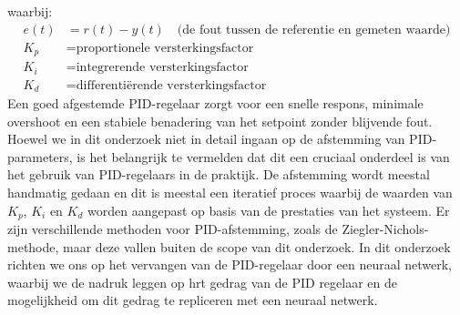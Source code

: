 waarbij:
\[
\begin{aligned}
e(t) &= r(t) - y(t) \quad \text{(de fout tussen de referentie en gemeten waarde)} \\
K_p  &= \text{proportionele versterkingsfactor} \\
K_i  &= \text{integrerende versterkingsfactor} \\
K_d  &= \text{differentiërende versterkingsfactor}
\end{aligned}
\]
Een goed afgestemde PID-regelaar zorgt voor een snelle respons, minimale overshoot en een stabiele benadering van het setpoint zonder blijvende fout. Hoewel we in dit onderzoek niet in detail ingaan op de afstemming van PID-parameters, is het belangrijk te vermelden dat dit een cruciaal onderdeel is van het gebruik van PID-regelaars in de praktijk. De afstemming wordt meestal handmatig gedaan en dit is meestal een iteratief proces waarbij de waarden van \(K_p\), \(K_i\) en \(K_d\) worden aangepast op basis van de prestaties van het systeem. Er zijn verschillende methoden voor PID-afstemming, zoals de Ziegler-Nichols-methode, maar deze vallen buiten de scope van dit onderzoek. In dit onderzoek richten we ons op het vervangen van de PID-regelaar door een neuraal netwerk, waarbij we de nadruk leggen op hrt gedrag van de PID regelaar en de mogelijkheid om dit gedrag te repliceren met een neuraal netwerk.
